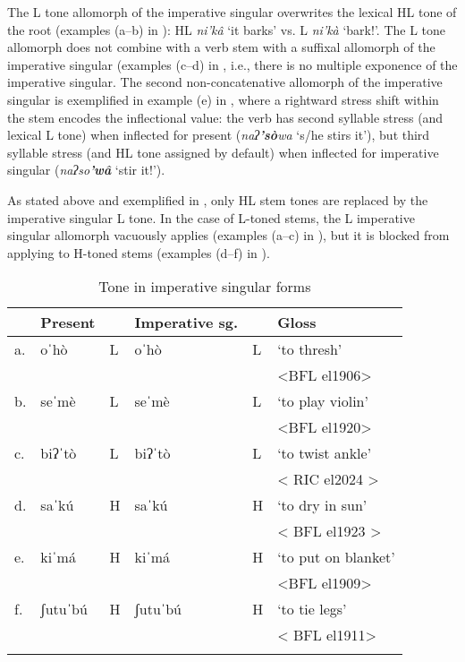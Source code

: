 The L tone allomorph of the imperative singular overwrites the lexical HL tone of the root (examples (a--b) in ): HL \textit{ni'kâ} `it barks' vs. L \textit{ni'kà} `bark!'. The L tone allomorph does not combine with a verb stem with a suffixal allomorph of the imperative singular (examples (c--d) in , i.e., there is no multiple exponence of the imperative singular. The second non-concatenative allomorph of the imperative singular is exemplified in example (e) in , where a rightward stress shift within the stem encodes the inflectional value: the verb has second syllable stress (and lexical L tone) when inflected for present (\textit{naʔ\textbf{'sò}wa} `s/he stirs it'), but third syllable stress (and HL tone assigned by default) when inflected for imperative singular (\textit{naʔso\textbf{'wâ}} `stir it!').

As stated above and exemplified in , only HL stem tones are replaced by the imperative singular L tone. In the case of L-toned stems, the L imperative singular allomorph vacuously applies (examples (a--c) in ), but it is blocked from applying to H-toned stems (examples (d--f) in ).


\begin{table}
\caption{Tone in imperative singular forms}
\label{tab:tone-imperative-sg}

\begin{tabularx}{.9\textwidth}{l lX lX l}
\lsptoprule
&\textbf{Present} &   & \textbf{Imperative sg.} &  & \textbf{Gloss}\\
\midrule
a.&  oˈhò	&	L &	oˈhò & 		L &‘to thresh' \\
& & & & & <BFL el1906>\\
b.& seˈmè   &   	L	& seˈmè  &          	L	& ‘to play violin’ \\
& & & & &  <BFL el1920>\\
c.& biʔˈtò	&	L	& biʔˈtò &		L & ‘to twist ankle’\\
& & & & & < RIC el2024 >\\
d.& saˈkú    &   	H	& saˈkú  &       H	& ‘to dry in sun’ \\
& & & & & < BFL el1923 >\\
e.& kiˈmá	&	H &	kiˈmá &		H & ‘to put on blanket' \\
& & & & & <BFL el1909>\\
f.& ʃutuˈbú &	H	& ʃutuˈbú &	H	& ‘to tie legs’\\
& & & & & < BFL el1911>\\
\lspbottomrule
\end{tabularx}
\end{table}

